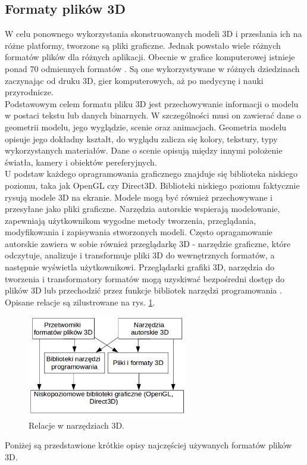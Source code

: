 \newpage
\subsection{Formaty plików 3D}
W celu ponownego wykorzystania skonstruowanych modeli 3D i przesłania ich na różne platformy, tworzone są pliki graficzne. Jednak powstało wiele różnych formatów plików dla różnych aplikacji. Obecnie w grafice komputerowej istnieje ponad 70 odmiennych formatów%
. Są one wykorzystywane w różnych dziedzinach zaczynając od druku 3D, gier komputerowych, aż po medycynę i nauki przyrodnicze. \\
Podstawowym celem formatu pliku 3D jest przechowywanie informacji o modelu w postaci tekstu lub danych binarnych. W szczególności musi on zawierać dane o geometrii modelu, jego wyglądzie, scenie oraz animacjach. Geometria modelu opisuje jego dokładny kształt, do wyglądu zalicza się kolory, tekstury, typy wykorzystanych materiałów. Dane o scenie opisują między innymi położenie światła, kamery i obiektów pereferyjnych. \\
U podstaw każdego opragramowania graficznego znajduje się biblioteka niskiego poziomu, taka jak OpenGL czy Direct3D. Biblioteki niskiego poziomu faktycznie rysują modele 3D na ekranie. Modele mogą być również przechowywane i przesyłane jako pliki graficzne. Narzędzia autorskie wspierają modelowanie, zapewniają użytkownikom wygodne metody tworzenia, przeglądania, modyfikowania i zapisywania stworzonych modeli. Często opragamowanie autorskie zawiera w sobie również przeglądarkę 3D - narzędzie graficzne, które odczytuje, analizuje i transformuje pliki 3D do wewnętrznych formatów, a następnie wyświetla użytkownikowi. Przeglądarki grafiki 3D, narzędzia do tworzenia i transformatory formatów mogą uzyskiwać bezpośredni dostęp do plików 3D lub przechodzić przez funkcje bibliotek narzędzi programowania \cite{formatsinfo}. Opisane relacje są zilustrowane na rys. \ref{rys5}.
\begin{figure}[H]
		\centering
 		\includegraphics[width=7.0cm]{relacje.png}
    	\caption{Relacje w narzędziach 3D.}
 		\label{rys5}
\end{figure}
Poniżej są przedstawione krótkie opisy najczęściej używanych formatów plików 3D. %

